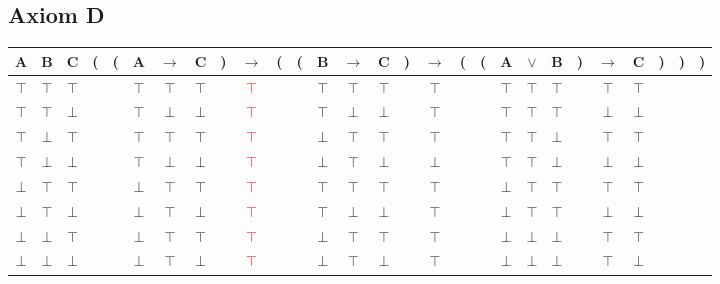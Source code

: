 \documentclass{article}
\begin{document}
\subsection{Axiom D}
\begin{tabular}{@{ }c@{ }@{ }c@{ }@{ }c | c@{}@{}c@{}@{ }c@{ }@{ }c@{ }@{ }c@{ }@{}c@{}@{ }c@{ }@{}c@{}@{}c@{}@{ }c@{ }@{ }c@{ }@{ }c@{ }@{}c@{}@{ }c@{ }@{}c@{}@{}c@{}@{ }c@{ }@{ }c@{ }@{ }c@{ }@{}c@{}@{ }c@{ }@{ }c@{ }@{}c@{}@{}c@{}@{}c@{ }}
A & B & C & ( & ( & A & $\rightarrow$ & C & ) & $\rightarrow$ & ( & ( & B & $\rightarrow$ & C & ) & $\rightarrow$ & ( & ( & A & $\lor$ & B & ) & $\rightarrow$ & C & ) & ) & )\\
\hline 
$\top$ & $\top$ & $\top$ &  &  & $\top$ & $\top$ & $\top$ &  & \textcolor{red}{$\top$} &  &  & $\top$ & $\top$ & $\top$ &  & $\top$ &  &  & $\top$ & $\top$ & $\top$ &  & $\top$ & $\top$ &  &  & \\
$\top$ & $\top$ & $\bot$ &  &  & $\top$ & $\bot$ & $\bot$ &  & \textcolor{red}{$\top$} &  &  & $\top$ & $\bot$ & $\bot$ &  & $\top$ &  &  & $\top$ & $\top$ & $\top$ &  & $\bot$ & $\bot$ &  &  & \\
$\top$ & $\bot$ & $\top$ &  &  & $\top$ & $\top$ & $\top$ &  & \textcolor{red}{$\top$} &  &  & $\bot$ & $\top$ & $\top$ &  & $\top$ &  &  & $\top$ & $\top$ & $\bot$ &  & $\top$ & $\top$ &  &  & \\
$\top$ & $\bot$ & $\bot$ &  &  & $\top$ & $\bot$ & $\bot$ &  & \textcolor{red}{$\top$} &  &  & $\bot$ & $\top$ & $\bot$ &  & $\bot$ &  &  & $\top$ & $\top$ & $\bot$ &  & $\bot$ & $\bot$ &  &  & \\
$\bot$ & $\top$ & $\top$ &  &  & $\bot$ & $\top$ & $\top$ &  & \textcolor{red}{$\top$} &  &  & $\top$ & $\top$ & $\top$ &  & $\top$ &  &  & $\bot$ & $\top$ & $\top$ &  & $\top$ & $\top$ &  &  & \\
$\bot$ & $\top$ & $\bot$ &  &  & $\bot$ & $\top$ & $\bot$ &  & \textcolor{red}{$\top$} &  &  & $\top$ & $\bot$ & $\bot$ &  & $\top$ &  &  & $\bot$ & $\top$ & $\top$ &  & $\bot$ & $\bot$ &  &  & \\
$\bot$ & $\bot$ & $\top$ &  &  & $\bot$ & $\top$ & $\top$ &  & \textcolor{red}{$\top$} &  &  & $\bot$ & $\top$ & $\top$ &  & $\top$ &  &  & $\bot$ & $\bot$ & $\bot$ &  & $\top$ & $\top$ &  &  & \\
$\bot$ & $\bot$ & $\bot$ &  &  & $\bot$ & $\top$ & $\bot$ &  & \textcolor{red}{$\top$} &  &  & $\bot$ & $\top$ & $\bot$ &  & $\top$ &  &  & $\bot$ & $\bot$ & $\bot$ &  & $\top$ & $\bot$ &  &  & \\
\end{tabular}
\end{document}
